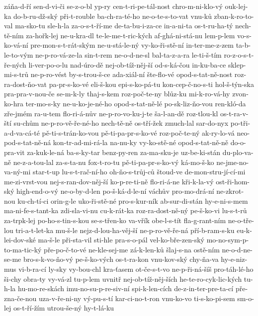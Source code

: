 {záňa-d-ří
sen-d-vi-či
se-z-o-bl
yp-ry
cen-t-ri-pe-tál-nost
chro-m-ni-klo-vý
ouk-lej-ka
do-b-ru-dž-ský
při-t-rouble
ba-ch-ra-té-ho
ne-o-te-s-to-vat
vnu-ků
zban-k-ro-to-val
ma-sko-tu
sle-h-la
za-o-s-t-ří-me
de-ta-bu-i-za-ce
in-a-ni-ta
os-t-ru-ha-tý
nech-tě-ním
za-hořk-lej
ne-u-kra-dl
te-le-me-t-ric-kých
af-ghá-ni-stá-nu
lem-p-lem
vo-s-ko-vá-ní
pre-mon-s-t-rát-ským
ne-u-stá-le-ný
vy-ko-ři-stě-ní
in-ter-me-z-zem
ta-b-le-to-vým
ne-p-ro-vá-ze-la
sin-t-rem
ne-o-d-ne-sl
bal-ta-z-a-ra
le-ti-š-tím
ro-z-o-s-t-ře-ných
li-ver-po-o-lu
nad-úro-dě
nej-ob-tíž-něj-ší
od-s-ká-čou
in-ku-ba-ce
sklep-mi-s-trů
ne-p-ro-vést
by-s-trou-š-ce
ada-xiál-ní
šte-flo-vé
opod-s-tat-ně-nost
roz-ra-dost-ňo-vat
pa-pr-s-ko-vé
eli-š-kou
epi-s-ko-pá-tu
kon-cep-č-no-s-ti
hol-š-týn-ska
pra-pra-v-nou-če
se-m-k-ly
thaj-s-kem
roz-poč-te-ny
blůz-ku
mi-k-ro-vá-hy
zvon-ko-hra
ter-mo-s-ky
ne-u-ko-je-né-ho
opod-s-tat-ně-lé
po-sk-liz-ňo-vou
ren-kló-da
zře-jmém
ra-u-tem
flo-ri-á-nův
ne-p-ro-vo-ku-j-te
ša-l-an-dě
roz-tlou-kl
os-t-ra-v-ští
su-chům
ne-p-ro-vě-ře-né-ho
nech-tě-ně
os-tří-žek
zmuch-lal
sar-do-nyx
po-tři-a-d-va-cá-té
pě-ti-s-trán-ko-vou
pě-ti-pa-pr-s-ko-vé
roz-poč-te-ný
ak-ry-lo-vá
neo-pod-s-tat-ně-ná
kon-tr-ad-mi-rá-la
na-nu-ky
vy-ko-stě-né
opod-s-tat-ně-ně
do-o-pra-vit
za-kuk-le-ná
ba-s-ky-tar
benz-py-ren
za-ma-sku-je
uz-be-ki-stán
du-plo-va-ně
ne-z-a-tou-lal
za-s-ta-nu
fox-t-ro-tu
pě-ti-pa-pr-s-ko-vý
ká-mo-š-ko
ne-jme-no-va-ný-mi
star-t-up
lu-s-t-rač-ní-ho
oh-ňo-s-trůj-ců
štoud-ve
de-mon-stru-jí-cí-mi
me-zi-vrst-vou
nej-s-ran-dov-něj-ší
ko-p-re-ti-ně
flo-ri-á-ne
kři-k-la-vý
ost-ři-hom-ský
high-end-o-vý
ne-o-by-d-len
po-š-ká-d-le-ní
váchův
pro-mo-drá-ní
ne-zkrot-nou
ku-ch-tí-ci
orin-g-le
uko-ři-stě-né
pro-s-kur-ník
ab-sur-di-stán
hy-e-ni-s-mem
ma-ni-fe-s-tant-ka
zdi-sla-vi-nu
cu-k-rát-ka
roz-ra-dost-ně-ný
pe-š-ko-vi
lu-s-t-rů
za-trpk-lej
po-ho-s-tin-s-kou
se-s-třen-ko
va-vřík
obe-l-s-tít
fla-g-rant-ním
ne-o-tře-lou
tri-a-t-let-ka
mu-š-le
nejz-d-lou-ha-věj-ší
ne-p-ro-vě-ře-ná
pří-b-ram-s-ku
eu-k-lei-dov-ské
ma-š-le
při-sta-vil
sti-hle
pra-s-o-pál
vel-ko-bře-zen-ský
mo-no-sym-p-to-ma-tic-ký
pře-po-č-to-vé
ne-kle-sej-me
zá-k-len-ků
šlaj-s-na
ostě-ním
ne-o-d-ne-se-me
bro-s-k-vo-ňo-vý
pe-š-ko-vých
os-t-ra-kon
vnu-kov-ský
chy-ňa-va
hy-e-niz-mus
vi-b-ra-cí
ly-sky
vy-bou-chl
kra-ťasem
ot-če-s-t-vo
ne-p-ři-ná-šíš
pro-táh-lé-ho
ši-chy
obra-ty
vy-vá-zl
tu-p-lem
uvnitř
nej-ob-tíž-něj-ších
he-te-ro-cyk-lic-kých
tu-h-la
hu-mo-re-skách
imu-no-su-p-re-siv-ní
spi-k-len-cích
de-z-in-ter-pre-ta-cí
pře-zna-če-nou
uza-v-ře-ni-ny
vý-pu-s-tí
kar-ci-no-t-ron
vnu-ko-vo
ti-s-ko-pi-sem
sm-o-lej
os-t-ří-žím
utrou-še-ný
hy-t-lá-ku
}
